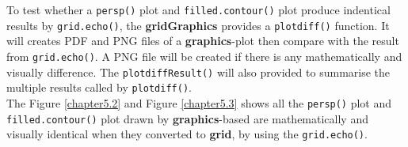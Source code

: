 \documentclass[paper=a4, fontsize=11pt]{report}
\begin{document}
\newpage
To test whether a \texttt{persp()} plot and \texttt{filled.contour()} plot produce indentical results by \texttt{grid.echo()}, the \textbf{gridGraphics} provides a \texttt{plotdiff()} function. It will creates PDF and PNG files of a \textbf{graphics}-plot then compare with the result from \texttt{grid.echo()}. A PNG file will be created if there is any mathematically and visually difference. The \texttt{plotdiffResult()} will also provided to summarise the multiple results called by \texttt{plotdiff()}.\\
  The Figure \ref{chapter5.2} and Figure \ref{chapter5.3} shows all the \texttt{persp()} plot and \texttt{filled.contour()} plot drawn by \textbf{graphics}-based are mathematically and visually identical when they converted to \textbf{grid}, by using the \texttt{grid.echo()}.
\end{document}
